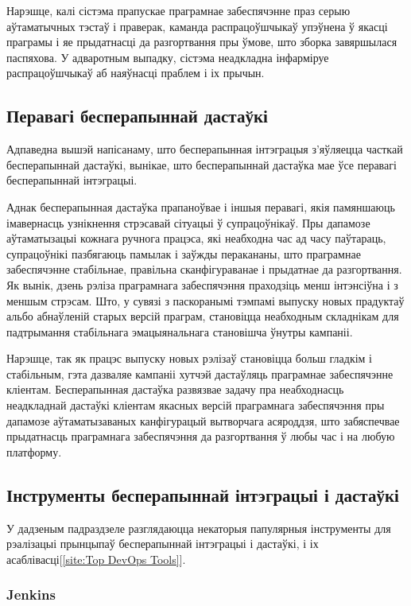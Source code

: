 Нарэшце, калі сістэма прапускае праграмнае забеспячэнне
праз серыю аўтаматычных тэстаў і праверак, каманда распрацоўшчыкаў
упэўнена ў якасці праграмы і яе прыдатнасці да разгортвання
пры ўмове, што зборка завяршылася паспяхова.
У адваротным выпадку, сістэма неадкладна інфарміруе распрацоўшчыкаў
аб наяўнасці праблем і іх прычын.

\subsection{Перавагі бесперапыннай дастаўкі}

Адпаведна вышэй напісанаму, што бесперапынная інтэграцыя з'яўляецца
часткай бесперапыннай дастаўкі, вынікае, што бесперапыннай дастаўка
мае ўсе перавагі бесперапыннай інтэграцыі.

Аднак бесперапынная дастаўка прапаноўвае і іншыя перавагі, якія
памяншаюць іма\-вер\-насць узнікнення стрэсавай сітуацыі ў супрацоўнікаў.
Пры дапамозе аўтаматызацыі кожнага ручнога працэса, які неабходна
час ад часу паўтараць, супрацоўнікі пазбягаюць памылак і заўжды
перакананы, што праграмнае забеспячэнне стабільнае, правільна
сканфігураванае і прыдатнае да разгортвання.
Як вынік, дзень рэліза праграмнага забеспячэння праходзіць менш
інтэнсіўна і з меншым стрэсам.
Што, у сувязі з паскоранымі тэмпамі выпуску новых прадуктаў
альбо абнаўленій старых версій праграм, становіцца неабходным складнікам
для падтрымання стабільнага эмацыянальнага становішча ўнутры кампаніі.

Нарэшце, так як працэс выпуску новых рэлізаў становіцца больш гладкім і
стабільным, гэта дазваляе кампаніі хутчэй дастаўляць
праграмнае забеспячэнне кліентам.
Бесперапынная дастаўка развязвае задачу пра неабходнасць
неадкладнай дастаўкі кліентам якасных версій праграмнага забеспячэння
пры дапамозе аўтаматызаваных канфігурацый вытворчага асяроддзя, што
забяспечвае прыдатнасць праграмнага забеспячэння да разгортвання
ў любы час і на любую платформу.


\subsection{Інструменты бесперапыннай інтэграцыі і дастаўкі}

У дадзеным падраздзеле разглядаюцца некаторыя папулярныя інструменты для
рэалізацыі прынцыпаў бесперапыннай інтэграцыі і дастаўкі,
і іх асаблівасці[\ref{site:Top DevOps Tools}].

\subsubsection{Jenkins}

